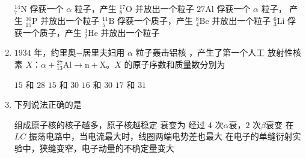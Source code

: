 \begin{enumerate}
\fourchoices
{${ }_{7}^{14} \mathrm{N}$ 俘获一个 $\alpha$ 粒子，产生 ${ }_{8}^{17} \mathrm{O}$ 并放出一个粒子}
{$27 \mathrm{Al}$ 俘获一个 $\alpha$ 粒子， 产生 ${ }_{15}^{30} \mathrm{P}$ 并放出一个粒子}
{${ }_{5}^{11} \mathrm{B}$ 俘获一个质子，产生 ${ }_{4}^{8} \mathrm{Be}$ 并放出一个粒子}
{${ }_{3}^{6} \mathrm{Li}$ 俘获一个质子，产生 ${ }_{2}^{3} \mathrm{He}$ 并放出一个粒子}


\item 
{}
$ 1934 $ 年，约里奥$ - $居里夫妇用 $ \alpha $ 粒子轰击铝核  ，产生了第一个人工
放射性核素 $ X $：$\alpha+{ }_{13}^{27} \mathrm{Al} \rightarrow \mathrm{n}+\mathrm{X}$。$ X $ 的原子序数和质量数分别为  

\fourchoices
{$ 15 $ 和 $ 28 $}
{$ 15 $ 和 $ 30 $}
{$ 16 $ 和 $ 30 $}
{$ 17 $ 和 $ 31 $}


\item 
{}
下列说法正确的是  

\fourchoices
{组成原子核的核子越多，原子核越稳定}
{ 衰变为  经过 $ 4 $ 次$ \alpha $衰，$ 2 $ 次$ \beta $衰变}
{在 $ LC $ 振荡电路中，当电流最大时，线圈两端电势差也最大}
{在电子的单缝衍射实验中，狭缝变窄，电子动量的不确定量变大}





	
	
	
\end{enumerate}

